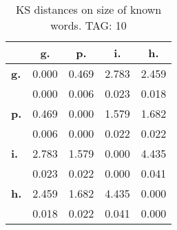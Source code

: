 \begin{table}[h!]
\begin{center}
\begin{tabular}{| l || c | c | c | c |}\hline
 & {\bf g.} & {\bf p.} & {\bf i.} & {\bf h.} \\\hline\hline
{\bf g.} & 0.000 & 0.469 & 2.783 & 2.459 \\
{\bf } & 0.000 & 0.006 & 0.023 & 0.018 \\\hline
{\bf p.} & 0.469 & 0.000 & 1.579 & 1.682 \\
{\bf } & 0.006 & 0.000 & 0.022 & 0.022 \\\hline
{\bf i.} & 2.783 & 1.579 & 0.000 & 4.435 \\
{\bf } & 0.023 & 0.022 & 0.000 & 0.041 \\\hline
{\bf h.} & 2.459 & 1.682 & 4.435 & 0.000 \\
{\bf } & 0.018 & 0.022 & 0.041 & 0.000 \\\hline
\end{tabular}
\caption{KS distances on size of known words. TAG: 10}
\end{center}
\end{table}